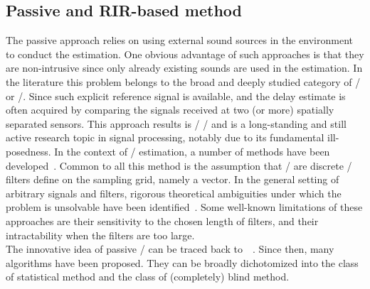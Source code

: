 \subsection{Passive and RIR-based method}
The passive approach relies on using external sound sources in the environment to conduct the estimation.
One obvious advantage of such approaches is that they are non-intrusive since only already existing sounds are used in the estimation.
In the literature this problem belongs to the broad and deeply studied category of \BCE/ or \BSI/.
Since such explicit reference signal is available, and the delay estimate is often acquired by comparing the signals received at two (or more) spatially separated sensors.
This approach results is \SIMO/ \BSI/ and is a long-standing and still active research topic in signal processing, notably due to its fundamental ill-posedness.
In the context of \RIR/ estimation, a number of methods have been developed~\citeonly{}.
Common to all this method is the assumption that \RIR/ are discrete \FIR/ filters define on the sampling grid, namely a vector.
In the general setting of arbitrary signals and filters, rigorous theoretical ambiguities under which the problem is unsolvable have been identified~.
Some well-known limitations of these approaches are their sensitivity to the chosen length of filters, and their intractability when the filters are too large.
\\The innovative idea of passive \BCE/ can be traced back to~~.
Since then, many algorithms have been proposed.
They can be broadly dichotomized into the class of statistical method and the class of (completely) blind method.


